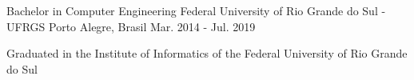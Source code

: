 

\begin{cventries}

  \cventry
    {Bachelor in Computer Engineering} %
    {Federal University of Rio Grande do Sul - UFRGS} %
    {Porto Alegre, Brasil} %
    {Mar. 2014 - Jul. 2019} %
    {
      \begin{cvitems} %
        \item {Graduated in the Institute of Informatics of the Federal University of Rio Grande do Sul}
      \end{cvitems}
    }


\end{cventries}
